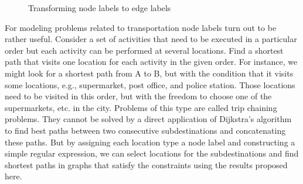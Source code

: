 \documentclass[]{article}
\numberwithin{equation}{section}
\begin{document}
\begin{figure}[h]
	\centering
	
	\vspace{1em}
	
	\caption{Transforming node labels to edge labels}
	\label{fig:nodelabels}
\end{figure}

For modeling problems related to transportation node labels turn out to be rather useful. Consider a set of activities that need to be executed in a particular order but each activity can be performed at several locations. Find a shortest path that visits one location for each activity in the given order. For instance, we might look for a shortest path from A to B, but with the condition that it visits some locations, e.g., supermarket, post office, and police station. Those locations need to be visited in this order, but with the freedom to choose one of the supermarkets, etc. in the city. Problems of this type are called trip chaining problems. They cannot be solved by a direct application of Dijkstra’s algorithm to find best paths between two consecutive subdestinations and concatenating these paths. But by assigning each location type a node label and constructing a simple regular expression, we can select locations for the subdestinations and find shortest paths in graphs that satisfy the constraints using the results proposed here.
\end{document}

